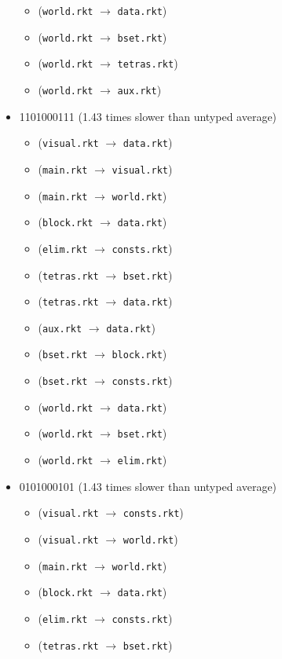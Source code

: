 \documentclass{article}
\newcommand{\mono}[1]{\texttt{#1}}
\begin{document}
\begin{itemize}
\begin{itemize}
  \item (\mono{world.rkt} $\rightarrow$ \mono{data.rkt})
  \item (\mono{world.rkt} $\rightarrow$ \mono{bset.rkt})
  \item (\mono{world.rkt} $\rightarrow$ \mono{tetras.rkt})
  \item (\mono{world.rkt} $\rightarrow$ \mono{aux.rkt})
  \end{itemize}
\item 1101000111 (1.43 times slower than untyped average)
  \begin{itemize}
  \item (\mono{visual.rkt} $\rightarrow$ \mono{data.rkt})
  \item (\mono{main.rkt} $\rightarrow$ \mono{visual.rkt})
  \item (\mono{main.rkt} $\rightarrow$ \mono{world.rkt})
  \item (\mono{block.rkt} $\rightarrow$ \mono{data.rkt})
  \item (\mono{elim.rkt} $\rightarrow$ \mono{consts.rkt})
  \item (\mono{tetras.rkt} $\rightarrow$ \mono{bset.rkt})
  \item (\mono{tetras.rkt} $\rightarrow$ \mono{data.rkt})
  \item (\mono{aux.rkt} $\rightarrow$ \mono{data.rkt})
  \item (\mono{bset.rkt} $\rightarrow$ \mono{block.rkt})
  \item (\mono{bset.rkt} $\rightarrow$ \mono{consts.rkt})
  \item (\mono{world.rkt} $\rightarrow$ \mono{data.rkt})
  \item (\mono{world.rkt} $\rightarrow$ \mono{bset.rkt})
  \item (\mono{world.rkt} $\rightarrow$ \mono{elim.rkt})
  \end{itemize}
\item 0101000101 (1.43 times slower than untyped average)
  \begin{itemize}
  \item (\mono{visual.rkt} $\rightarrow$ \mono{consts.rkt})
  \item (\mono{visual.rkt} $\rightarrow$ \mono{world.rkt})
  \item (\mono{main.rkt} $\rightarrow$ \mono{world.rkt})
  \item (\mono{block.rkt} $\rightarrow$ \mono{data.rkt})
  \item (\mono{elim.rkt} $\rightarrow$ \mono{consts.rkt})
  \item (\mono{tetras.rkt} $\rightarrow$ \mono{bset.rkt})

\end{itemize}
\end{itemize}
\end{document}
